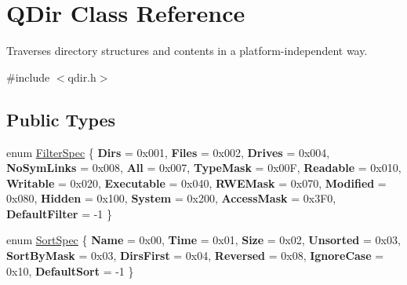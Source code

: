 \hypertarget{class_q_dir}{}\section{Q\+Dir Class Reference}
\label{class_q_dir}


Traverses directory structures and contents in a platform-\/independent way.  




{\ttfamily \#include $<$qdir.\+h$>$}

\subsection*{Public Types}
\begin{DoxyCompactItemize}
\item 
enum \mbox{\hyperlink{class_q_dir_a8b8c5b4f0028081f094c85129b8cc8b1}{Filter\+Spec}} \{ \newline
{\bfseries Dirs} = 0x001, 
{\bfseries Files} = 0x002, 
{\bfseries Drives} = 0x004, 
{\bfseries No\+Sym\+Links} = 0x008, 
\newline
{\bfseries All} = 0x007, 
{\bfseries Type\+Mask} = 0x00F, 
{\bfseries Readable} = 0x010, 
{\bfseries Writable} = 0x020, 
\newline
{\bfseries Executable} = 0x040, 
{\bfseries R\+W\+E\+Mask} = 0x070, 
{\bfseries Modified} = 0x080, 
{\bfseries Hidden} = 0x100, 
\newline
{\bfseries System} = 0x200, 
{\bfseries Access\+Mask} = 0x3\+F0, 
{\bfseries Default\+Filter} = -\/1
 \}
\item 
enum \mbox{\hyperlink{class_q_dir_a428a858abe9593efc498b6641b41994c}{Sort\+Spec}} \{ \newline
{\bfseries Name} = 0x00, 
{\bfseries Time} = 0x01, 
{\bfseries Size} = 0x02, 
{\bfseries Unsorted} = 0x03, 
\newline
{\bfseries Sort\+By\+Mask} = 0x03, 
{\bfseries Dirs\+First} = 0x04, 
{\bfseries Reversed} = 0x08, 
{\bfseries Ignore\+Case} = 0x10, 
\newline
{\bfseries Default\+Sort} = -\/1
 \}
\end{DoxyCompactItemize}
